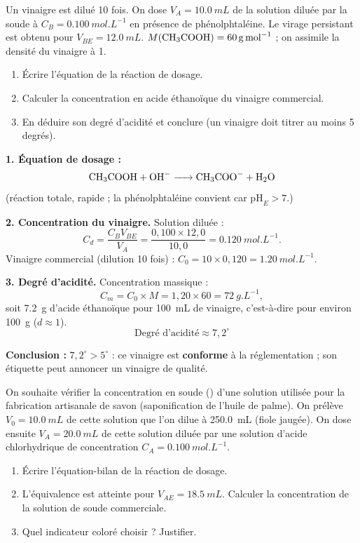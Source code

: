 \documentclass[11pt]{article}
\newcounter{popsec}
\newcounter{popsub}
\newcommand{\courssub}[1]{%
  \stepcounter{popsub}%
  \par\vspace{9pt}\noindent{\popxbold\fontsize{11.5}{13}\selectfont\color{popink}{\color{poporange}\thepopsec.\thepopsub}\hspace{6pt}#1}\par\nopagebreak\vspace{4pt}
}
\begin{document}
\begin{exoresolu}
Un vinaigre est dilué 10 fois. On dose $V_A = \SI{10,0}{mL}$ de la solution diluée par la soude à $C_B = \SI{0,100}{mol.L^{-1}}$ en présence de phénolphtaléine. Le virage persistant est obtenu pour $V_{BE} = \SI{12,0}{mL}$. $M(\ce{CH3COOH}) = \SI{60}{g.mol^{-1}}$ ; on assimile la densité du vinaigre à 1.
\begin{enumerate}
\item Écrire l'équation de la réaction de dosage.
\item Calculer la concentration en acide éthanoïque du vinaigre commercial.
\item En déduire son degré d'acidité et conclure (un vinaigre doit titrer au moins 5 degrés).
\end{enumerate}
\tcblower
\textbf{1. Équation de dosage :}
\[ \ce{CH3COOH + OH- -> CH3COO- + H2O} \]
(réaction totale, rapide ; la phénolphtaléine convient car $\mathrm{pH}_E > 7$.)

\textbf{2. Concentration du vinaigre.} Solution diluée :
\[ C_d = \frac{C_B V_{BE}}{V_A} = \frac{0{,}100 \times 12{,}0}{10{,}0} = \SI{0,120}{mol.L^{-1}}. \]
Vinaigre commercial (dilution 10 fois) : $C_0 = 10 \times 0{,}120 = \SI{1,20}{mol.L^{-1}}$.

\textbf{3. Degré d'acidité.} Concentration massique :
\[ C_m = C_0 \times M = 1{,}20 \times 60 = \SI{72}{g.L^{-1}}, \]
soit \SI{7,2}{g} d'acide éthanoïque pour \SI{100}{mL} de vinaigre, c'est-à-dire pour environ \SI{100}{g} ($d \approx 1$).
\[ \boxed{\text{Degré d'acidité} \approx 7{,}2^\circ} \]

\textbf{Conclusion :} $7{,}2^\circ > 5^\circ$ : ce vinaigre est \textbf{conforme} à la réglementation ; son étiquette peut annoncer un vinaigre de qualité.
\end{exoresolu}

\courssub{Exercices d'entraînement}

\begin{exercice}
On souhaite vérifier la concentration en soude () d'une solution utilisée pour la fabrication artisanale de savon (saponification de l'huile de palme). On prélève $V_0 = \SI{10,0}{mL}$ de cette solution que l'on dilue à \SI{250,0}{mL} (fiole jaugée). On dose ensuite $V_A = \SI{20,0}{mL}$ de cette solution diluée par une solution d'acide chlorhydrique de concentration $C_A = \SI{0,100}{mol.L^{-1}}$.
\begin{enumerate}
\item Écrire l'équation-bilan de la réaction de dosage.
\item L'équivalence est atteinte pour $V_{AE} = \SI{18,5}{mL}$. Calculer la concentration de la solution de soude commerciale.
\item Quel indicateur coloré choisir ? Justifier.
\end{enumerate}
\end{exercice}
\end{document}
